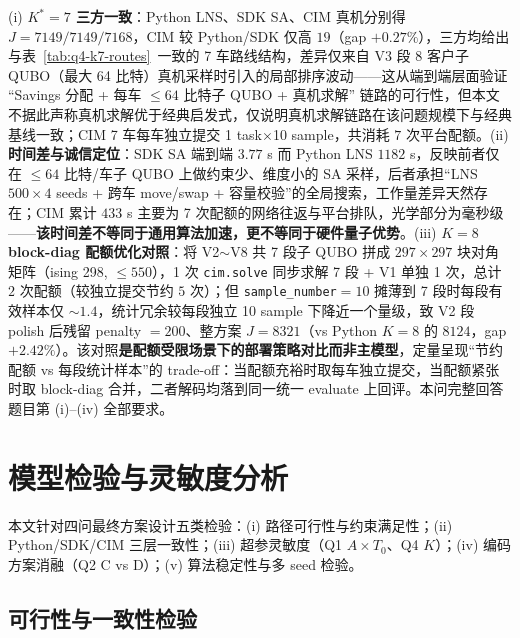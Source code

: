 \documentclass[UTF8,12pt,a4paper]{ctexart}
\begin{document}
(i) \textbf{$K^{*}=7$ 三方一致}：Python LNS、SDK SA、CIM 真机分别得 $J=7149/7149/7168$，CIM 较 Python/SDK 仅高 $19$（gap $+0.27\%$），三方均给出与表~\ref{tab:q4-k7-routes}~一致的 7 车路线结构，差异仅来自 V3 段 8 客户子 QUBO（最大 64 比特）真机采样时引入的局部排序波动——这从端到端层面验证 ``Savings 分配 + 每车 $\le 64$ 比特子 QUBO + 真机求解'' 链路的可行性，但本文不据此声称真机求解优于经典启发式，仅说明真机求解链路在该问题规模下与经典基线一致；CIM 7 车每车独立提交 1 task$\times$10 sample，共消耗 $7$ 次平台配额。(ii) \textbf{时间差与诚信定位}：SDK SA 端到端 $3.77$ s 而 Python LNS $1182$ s，反映前者仅在 $\le 64$ 比特/车子 QUBO 上做约束少、维度小的 SA 采样，后者承担``LNS $500\!\times\!4$ seeds + 跨车 move/swap + 容量校验''的全局搜索，工作量差异天然存在；CIM 累计 $433$ s 主要为 7 次配额的网络往返与平台排队，光学部分为毫秒级——\textbf{该时间差不等同于通用算法加速，更不等同于硬件量子优势}。(iii) \textbf{$K=8$ block-diag 配额优化对照}：将 V2$\sim$V8 共 7 段子 QUBO 拼成 $297\!\times\!297$ 块对角矩阵（ising 298, $\le 550$），1 次 \texttt{cim.solve} 同步求解 7 段 + V1 单独 1 次，总计 $2$ 次配额（较独立提交节约 $5$ 次）；但 \texttt{sample\_number}$=10$ 摊薄到 7 段时每段有效样本仅 $\sim 1.4$，统计冗余较每段独立 10 sample 下降近一个量级，致 V2 段 polish 后残留 penalty $=200$、整方案 $J=8321$（vs Python $K=8$ 的 $8124$，gap $+2.42\%$）。该对照\textbf{是配额受限场景下的部署策略对比而非主模型}，定量呈现``节约配额 vs 每段统计样本''的 trade-off：当配额充裕时取每车独立提交，当配额紧张时取 block-diag 合并，二者解码均落到同一统一 evaluate 上回评。本问完整回答题目第 (i)--(iv) 全部要求。

\section{模型检验与灵敏度分析}

本文针对四问最终方案设计五类检验：(i) 路径可行性与约束满足性；(ii) Python/SDK/CIM 三层一致性；(iii) 超参灵敏度（Q1 $A\!\times\!T_0$、Q4 $K$）；(iv) 编码方案消融（Q2 C vs D）；(v) 算法稳定性与多 seed 检验。

\subsection{可行性与一致性检验}
\label{sec:sens-feasibility}
\end{document}
